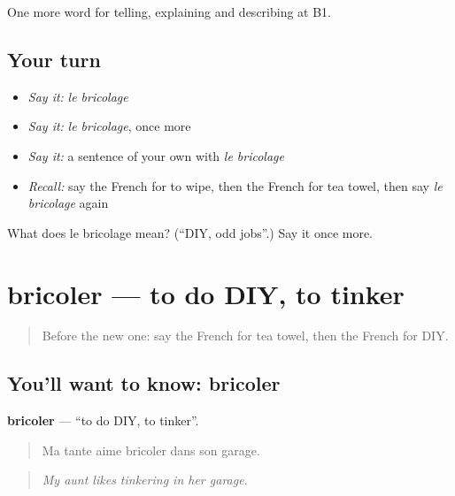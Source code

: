 \begin{grammarlens}[title={What you've built}]
One more word for telling, explaining and describing at B1.
\end{grammarlens}

\subsection*{Your turn}
\begin{itemize}
\raggedright
  \item \emph{Say it:} \emph{le bricolage}
  \item \emph{Say it:} \emph{le bricolage}, once more
  \item \emph{Say it:} a sentence of your own with \emph{le bricolage}
  \item \emph{Recall:} say the French for to wipe, then the French for tea towel, then say \emph{le bricolage} again
\end{itemize}

\begin{tcolorbox}[breakable,colback=teal!4,colframe=teal!35!black,title={Before you move on}]
What does le bricolage mean? (\textquotedblleft{}DIY, odd jobs\textquotedblright{}.) Say it once more.
\end{tcolorbox}
\section[bricoler]{bricoler — to do DIY, to tinker}

\label{lesson:FR-C531-bricoler}



\begin{quote}
Before the new one: say the French for tea towel, then the French for DIY.
\end{quote}

\subsection*{You'll want to know: bricoler}
\textbf{bricoler} — \textquotedblleft{}to do DIY, to tinker\textquotedblright{}.

\begin{quote}
Ma tante aime bricoler dans son garage.
\end{quote}

\begin{quote}
\emph{My aunt likes tinkering in her garage.}
\end{quote}

